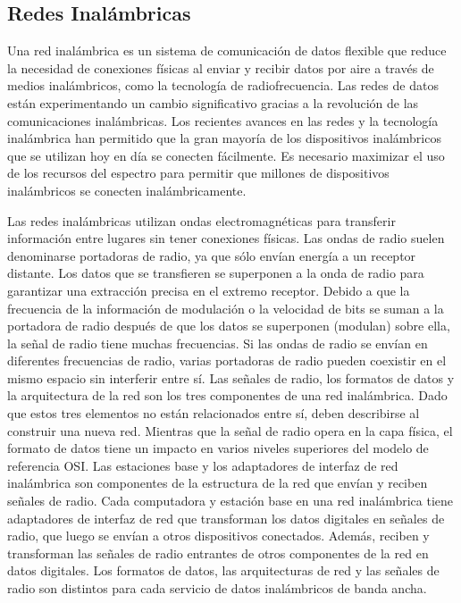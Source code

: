 \subsection{Redes Inalámbricas}
Una red inalámbrica es un sistema de comunicación de datos flexible que reduce la necesidad de conexiones físicas al enviar y recibir datos por aire a través de medios inalámbricos, como la tecnología de radiofrecuencia. Las redes de datos están experimentando un cambio significativo gracias a la revolución de las comunicaciones inalámbricas. Los recientes avances en las redes y la tecnología inalámbrica han permitido que la gran mayoría de los dispositivos inalámbricos que se utilizan hoy en día se conecten fácilmente. Es necesario maximizar el uso de los recursos del espectro para permitir que millones de dispositivos inalámbricos se conecten inalámbricamente. \parencite{tec_pundalik2023anwirnet}

Las redes inalámbricas utilizan ondas electromagnéticas para transferir información entre lugares sin tener conexiones físicas. Las ondas de radio suelen denominarse portadoras de radio, ya que sólo envían energía a un receptor distante. Los datos que se transfieren se superponen a la onda de radio para garantizar una extracción precisa en el extremo receptor. Debido a que la frecuencia de la información de modulación o la velocidad de bits se suman a la portadora de radio después de que los datos se superponen (modulan) sobre ella, la señal de radio tiene muchas frecuencias. Si las ondas de radio se envían en diferentes frecuencias de radio, varias portadoras de radio pueden coexistir en el mismo espacio sin interferir entre sí. Las señales de radio, los formatos de datos y la arquitectura de la red son los tres componentes de una red inalámbrica. Dado que estos tres elementos no están relacionados entre sí, deben describirse al construir una nueva red. Mientras que la señal de radio opera en la capa física, el formato de datos tiene un impacto en varios niveles superiores del modelo de referencia OSI. Las estaciones base y los adaptadores de interfaz de red inalámbrica son componentes de la estructura de la red que envían y reciben señales de radio. Cada computadora y estación base en una red inalámbrica tiene adaptadores de interfaz de red que transforman los datos digitales en señales de radio, que luego se envían a otros dispositivos conectados. Además, reciben y transforman las señales de radio entrantes de otros componentes de la red en datos digitales. Los formatos de datos, las arquitecturas de red y las señales de radio son distintos para cada servicio de datos inalámbricos de banda ancha. \parencite{tec_rafaqat2019surveywir}

